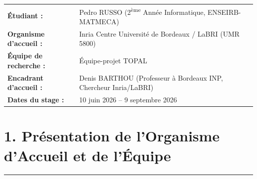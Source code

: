 \documentclass[11pt,a4paper]{article}
\begin{document}
\begin{center}
    \vspace*{-0.5cm}
\end{center}

\vspace{0.2cm}

\begin{table}[h!]
\centering
\small
\begin{tabular}{ll}
\textbf{Étudiant :} & Pedro RUSSO (2\textsuperscript{ème} Année Informatique, ENSEIRB-MATMECA) \\
\textbf{Organisme d'accueil :} & Inria Centre Université de Bordeaux / LaBRI (UMR 5800) \\
\textbf{Équipe de recherche :} & Équipe-projet TOPAL \\
\textbf{Encadrant d'accueil :} & Denis BARTHOU (Professeur à Bordeaux INP, Chercheur Inria/LaBRI) \\
\textbf{Dates du stage :} & 10 juin 2026 -- 9 septembre 2026 \\
\end{tabular}
\end{table}

\vspace{-0.2cm}

\section*{\color{darkBlue} 1. Présentation de l'Organisme d'Accueil et de l'Équipe}
\hrule
\vspace{0.2cm}
\end{document}
